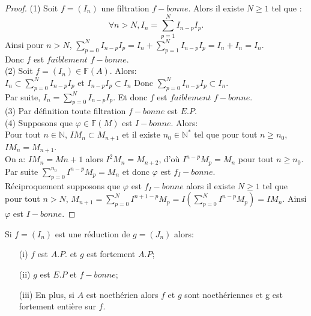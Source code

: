 \begin{proof}
	(1) Soit $f=(I_n)$ une filtration $f-bonne$. Alors il existe $N \geqslant 1$ tel que :
	\[ \forall n > N, I_n = \sum\limits_{p=1}^{N} I_{n-p}I_p. \]
	Ainsi pour $n> N$, $\sum\limits_{p=0}^{N} I_{n-p}I_p =  I_n + \sum\limits_{p=1}^{N} I_{n-p}I_p = I_n + I_n = I_n$. \\
	Donc $f$ est $faiblement$ $f-bonne$. \\
	(2) Soit $f=(I_n) \in \mathbb{F}(A)$. Alors:\\
	$I_n \subset \sum\limits_{p=0}^{N} I_{n-p}I_p$ et $ I_{n-p}I_p \subset I_n$
	Donc $\sum\limits_{p=0}^{N}I_{n-p}I_p \subset I_n$. \\ Par suite, $I_n = \sum\limits_{p=0}^{N} I_{n-p}I_p.$ Et donc $f$ est $faiblement$ $f-bonne$.\\
	(3) Par définition toute filtration $f-bonne$ est $E.P$.\\
	(4) Supposons que $\varphi \in \mathbb{F}(M)$ est $I-bonne$. Alors: \\
	Pour tout $n \in \mathbb{N}$, $IM_n \subset M_{n+1}$ et il existe $n_0 \in \mathbb{N}^{*}$ tel que pour tout $n \geqslant n_0$, $IM_n = M_{n+1}$.\\
	On a: $IM_n=M{n+1}$ alors $I^{2}M_n=M_{n+2}$, d'où $I^{n-p}M_p=M_n$ pour tout $n \geqslant n_0$.\\ Par suite $\sum\limits_{p=0}^{n_0}I^{n-p}M_p=M_n$ et donc $\varphi$ est $f_{I}-bonne$.\\
	Réciproquement supposons que $\varphi$ est $f_{I}-bonne$ alors il existe $N \geqslant 1$ tel que pour tout $n> N$, $M_{n+1} = \sum\limits_{p=0}^{N}I^{n+1-p}M_p =I(\sum\limits_{p=0}^{N}I^{n-p}M_p ) = IM_n$. Ainsi $\varphi$ est $I-bonne$.	
	
\end{proof}
\begin{maproposition}
	\label{maprop7}
	Si $f=(I_n)$ est une réduction de $g=(J_n)$ alors:
	\begin{enumerate}
		\item[(i)] $f$ est $A.P.$ et $g$ est fortement $A.P$;
		\item[(ii)] $g$ est $E.P$ et $f-bonne$;
		\item[(iii)] En plus, si $A$ est noethérien alors $f$ et $g$ sont noethériennes et g est fortement entière sur $f$.
	\end{enumerate}
\end{maproposition}
